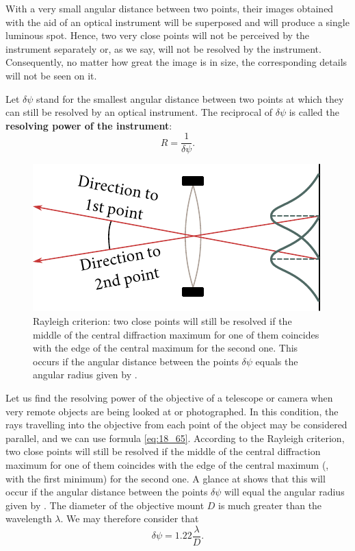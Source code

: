 With a very small angular distance between two points, their images obtained with the aid of an optical instrument will be superposed and will produce a single luminous spot.
Hence, two very close points will not be perceived by the instrument separately or, as we say, will not be resolved by the instrument.
Consequently, no matter how great the image is in size, the corresponding details will not be seen on it.

Let $\delta\psi$ stand for the smallest angular distance between two points at which they can still be resolved by an optical instrument.
The reciprocal of $\delta\psi$ is called the \textbf{resolving power of the instrument}:
\begin{equation}\label{eq:18_67}
	R = \frac{1}{\delta\psi}.
\end{equation}

\begin{figure}[!htb]
	\begin{center}
		\includegraphics[scale=0.9]{figures/ch_18/fig_18_48.pdf}
        \caption[]{Rayleigh criterion: two close points will still be resolved if the middle of the central diffraction maximum for one of them coincides with the edge of the central maximum for the second one. This occurs if the angular distance between the points $\delta\psi$ equals the angular radius given by .}
		\label{fig:18_48}
	\end{center}
	\vspace{-0.8cm}
\end{figure}

Let us find the resolving power of the objective of a telescope or camera when very remote objects are being looked at or photographed.
In this condition, the rays travelling into the objective from each point of the object may be considered parallel, and we can use formula \eqref{eq:18_65}.
According to the Rayleigh criterion, two close points will still be resolved if the middle of the central diffraction maximum for one of them coincides with the edge of the central maximum (\ie, with the first minimum) for the second one.
A glance at  shows that this will occur if the angular distance between the points $\delta\psi$ will equal the angular radius given by .
The diameter of the objective mount $D$ is much greater than the wavelength $\lambda$.
We may therefore consider that
\begin{equation*}
	\delta\psi = 1.22 \frac{\lambda}{D}.
\end{equation*}

